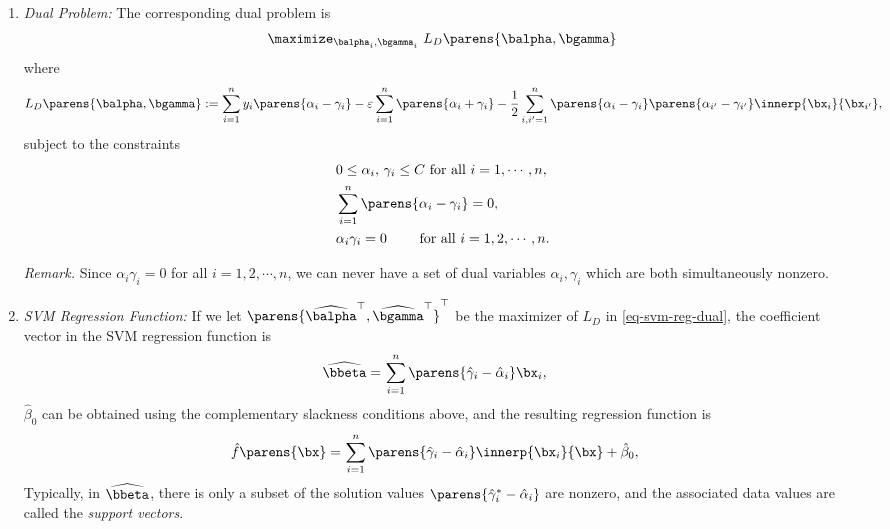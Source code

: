 \documentclass[12pt]{article}
\begin{document}
\begin{enumerate}[label=\textbf{\arabic*.}]
\begin{enumerate}
\begin{enumerate}
		\end{enumerate}
		
		\item \textit{Dual Problem:} The corresponding dual problem is 
		\begin{align}\label{eq-svm-reg-dual}
			\maximize_{\balpha_i, \bgamma_i} \ L_D \parens{\balpha, \bgamma} 
		\end{align}
		where 
		\begin{align*}
			L_D \parens{\balpha, \bgamma} := \sum_{i=1}^n y_i \parens{\alpha_i - \gamma_i} - \varepsilon \sum_{i=1}^n \parens{\alpha_i + \gamma_i} - \frac{1}{2} \sum_{i, i'=1}^n \parens{\alpha_i - \gamma_i} \parens{\alpha_{i'} - \gamma_{i'}} \innerp{\bx_i}{\bx_{i'}}, 
		\end{align*}
		subject to the constraints
		\begin{align*}
			& \, 0 \le \alpha_i, \, \gamma_i \le C \text{ for all } i = 1, \cdots, n, \\ 
			& \, \sum_{i=1}^n \parens{\alpha_i - \gamma_i} = 0, \\ 
			& \, \alpha_i \gamma_i = 0 \qquad \text{ for all } i = 1, 2, \cdots, n. 
		\end{align*}
		
		\textit{Remark.} Since $\alpha_i \gamma_i = 0$ for all $i = 1, 2, \cdots, n$, we can never have a set of dual variables $\alpha_i, \gamma_i$ which are both simultaneously nonzero. 
		
		\item \textit{SVM Regression Function:} If we let $\parens{\widehat{\balpha}^\top, \widehat{\bgamma}^\top}^\top$ be the maximizer of $L_D$ in \eqref{eq-svm-reg-dual}, the coefficient vector in the SVM regression function is 
		\begin{align*}
			\widehat{\bbeta} = & \, \sum_{i=1}^n \parens{\hat{\gamma}_i - \hat{\alpha}_i} \bx_i, 
		\end{align*}
		$\hat{\beta}_0$ can be obtained using the complementary slackness conditions above, and the resulting regression function is 
		\begin{align*} 
			\hat{f} \parens{\bx} = & \, \sum_{i=1}^n \parens{\hat{\gamma}_i - \hat{\alpha}_i} \innerp{\bx_i}{\bx} + \hat{\beta}_0, 
		\end{align*}
		Typically, in $\widehat{\bbeta}$, there is only a subset of the solution values $\parens{\hat{\gamma}_i^* - \hat{\alpha}_i}$ are nonzero, and the associated data values are called the \textit{support vectors}. 
	\end{enumerate}
	

\end{enumerate}
\end{document}

